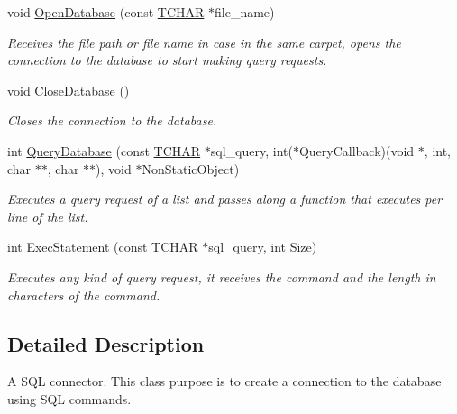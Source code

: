 \begin{DoxyCompactItemize}
\item 
void \hyperlink{classae_core_1_1ae_s_q_l_connector_af604e8c8435901e15f496a76762f36b7}{Open\+Database} (const \hyperlink{namespaceae_core_a052c557709e5ab43db521b23085fd916}{T\+C\+H\+AR} $\ast$file\+\_\+name)
\begin{DoxyCompactList}\small\item\em Receives the file path or file name in case in the same carpet, opens the connection to the database to start making query requests. \end{DoxyCompactList}\item 
void \hyperlink{classae_core_1_1ae_s_q_l_connector_a4b5f3e5b93afe08ed5fa09e9e8f349ed}{Close\+Database} ()\hypertarget{classae_core_1_1ae_s_q_l_connector_a4b5f3e5b93afe08ed5fa09e9e8f349ed}{}\label{classae_core_1_1ae_s_q_l_connector_a4b5f3e5b93afe08ed5fa09e9e8f349ed}

\begin{DoxyCompactList}\small\item\em Closes the connection to the database. \end{DoxyCompactList}\item 
int \hyperlink{classae_core_1_1ae_s_q_l_connector_ac1d0350ad470ed0210039d6be34f3382}{Query\+Database} (const \hyperlink{namespaceae_core_a052c557709e5ab43db521b23085fd916}{T\+C\+H\+AR} $\ast$sql\+\_\+query, int($\ast$Query\+Callback)(void $\ast$, int, char $\ast$$\ast$, char $\ast$$\ast$), void $\ast$Non\+Static\+Object)
\begin{DoxyCompactList}\small\item\em Executes a query request of a list and passes along a function that executes per line of the list. \end{DoxyCompactList}\item 
int \hyperlink{classae_core_1_1ae_s_q_l_connector_afde051a9349eb109bd118abe87bfcb11}{Exec\+Statement} (const \hyperlink{namespaceae_core_a052c557709e5ab43db521b23085fd916}{T\+C\+H\+AR} $\ast$sql\+\_\+query, int Size)
\begin{DoxyCompactList}\small\item\em Executes any kind of query request, it receives the command and the length in characters of the command. \end{DoxyCompactList}\end{DoxyCompactItemize}


\subsection{Detailed Description}
A S\+QL connector. This class purpose is to create a connection to the database using S\+QL commands. 

